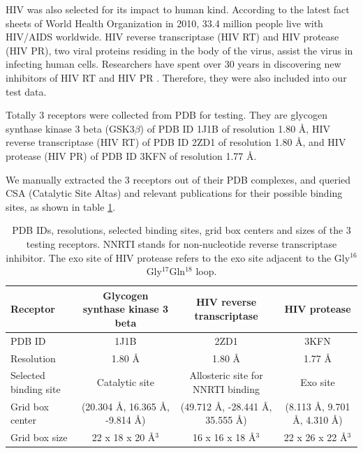 \documentclass[10pt,conference,letterpaper]{IEEEtran}
\begin{document}
HIV was also selected for its impact to human kind. According to the latest fact sheets of World Health Organization in 2010, 33.4 million people live with HIV/AIDS worldwide.
HIV reverse transcriptase (HIV RT) and HIV protease (HIV PR), two viral proteins residing in the body of the virus, assist the virus in infecting human cells.
Researchers have spent over 30 years in discovering new inhibitors of HIV RT and HIV PR \cite{221,RefWorks:222,RefWorks:223}.
Therefore, they were also included into our test data.

Totally 3 receptors were collected from PDB \cite{96} for testing.
They are glycogen synthase kinase 3 beta (GSK3$\beta$) of PDB ID 1J1B \cite{245} of resolution 1.80 \AA, HIV reverse transcriptase (HIV RT) of PDB ID 2ZD1 \cite{180} of resolution 1.80 \AA, and HIV protease (HIV PR) of PDB ID 3KFN \cite{243} of resolution 1.77 \AA.

We manually extracted the 3 receptors out of their PDB complexes, and queried CSA (Catalytic Site Altas) \cite{206} and relevant publications \cite{245,RefWorks:246,RefWorks:180,RefWorks:221,RefWorks:222,RefWorks:223,RefWorks:243} for their possible binding sites, as shown in table \ref{tab:searchspace}.

\begin{table}
\centering
\begin{tabular}
{lccc}
\noalign{\smallskip}\toprule
Receptor & Glycogen synthase kinase 3 beta & HIV reverse transcriptase & HIV protease\\
\midrule
\noalign{\smallskip}
PDB ID & 1J1B & 2ZD1 & 3KFN\\
Resolution & 1.80 \AA & 1.80 \AA & 1.77 \AA\\
Selected binding site & Catalytic site & Allosteric site for NNRTI binding & Exo site\\
Grid box center & (20.304 \AA, 16.365 \AA, -9.814 \AA) & (49.712 \AA, -28.441 \AA, 35.555 \AA) & (8.113 \AA, 9.701 \AA, 4.310 \AA) \\
Grid box size & 22 x 18 x 20 \AA$^3$ & 16 x 16 x 18 \AA$^3$ & 22 x 26 x 22 \AA$^3$\\
\bottomrule
\end{tabular}
\caption{PDB IDs, resolutions, selected binding sites, grid box centers and sizes of the 3 testing receptors. NNRTI stands for non-nucleotide reverse transcriptase inhibitor. The exo site of HIV protease refers to the exo site adjacent to the Gly$^{16}$Gly$^{17}$Gln$^{18}$ loop.}
\label{tab:searchspace}
\end{table}
\end{document}
